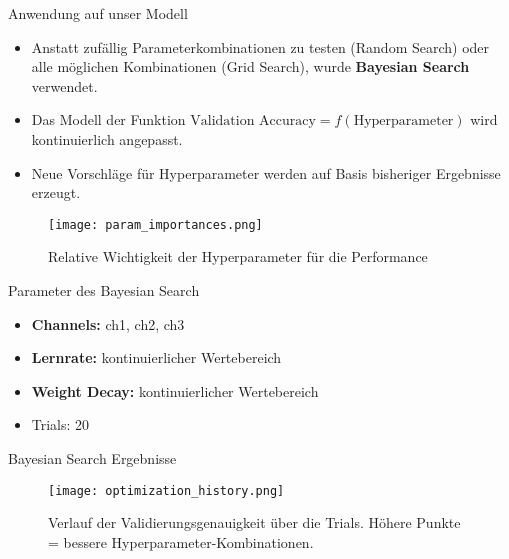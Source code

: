 \begin{frame}{Anwendung auf unser Modell}
\begin{itemize}
    \item Anstatt zufällig Parameterkombinationen zu testen (Random Search) oder alle möglichen Kombinationen (Grid Search), wurde \textbf{Bayesian Search} verwendet.
    \item Das Modell der Funktion $\text{Validation Accuracy} = f(\text{Hyperparameter})$ wird kontinuierlich angepasst.
    \item Neue Vorschläge für Hyperparameter werden auf Basis bisheriger Ergebnisse erzeugt.
\end{itemize}

\begin{figure}
    \centering
    \texttt{[image: param\_importances.png]}
    \caption{Relative Wichtigkeit der Hyperparameter für die Performance}
\end{figure}
\end{frame}

\begin{frame}{Parameter des Bayesian Search}
\begin{itemize}
    \item \textbf{Channels:} ch1, ch2, ch3
    \item \textbf{Lernrate:} kontinuierlicher Wertebereich
    \item \textbf{Weight Decay:} kontinuierlicher Wertebereich
    \item Trials: 20
\end{itemize}
\end{frame}

\begin{frame}{Bayesian Search Ergebnisse}
\begin{figure}
    \centering
    \texttt{[image: optimization\_history.png]}
    \caption{Verlauf der Validierungsgenauigkeit über die Trials. Höhere Punkte = bessere Hyperparameter-Kombinationen.}
\end{figure}
\end{frame}
